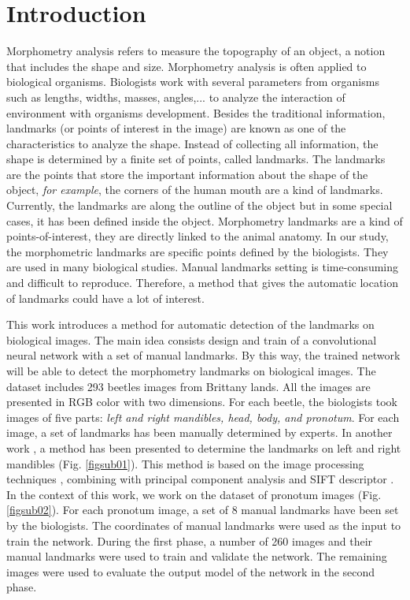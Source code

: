 \documentclass[conference]{IEEEtran}
\begin{document}
\section{Introduction}
Morphometry analysis refers to measure the topography of an object, a notion that includes the shape and size. Morphometry analysis is often applied to biological organisms. Biologists work with several parameters from organisms such as lengths, widths, masses, angles,... to analyze the interaction of environment with organisms development. Besides the traditional information, landmarks (or points of interest in the image) are known as one of the characteristics to analyze the shape. Instead of collecting all information, the shape is determined by a finite set of points, called landmarks. The landmarks are the points that store the important information about the shape of the object, \textit{for example}, the corners of the human mouth are a kind of landmarks. Currently, the landmarks are along the outline of the object but in some special cases, it has been defined inside the object. Morphometry landmarks are a kind of points-of-interest, they are directly linked to the animal anatomy. In our study, the morphometric landmarks are specific points defined by the biologists. They are used in many biological studies. Manual landmarks setting is time-consuming and difficult to reproduce. Therefore, a method that gives the automatic location of landmarks could have a lot of interest.

This work introduces a method for automatic detection of the landmarks on biological images. The main idea consists design and train of  a convolutional neural network \cite{lecun2010convolutional} with a set of manual landmarks. By this way, the trained network will be able to detect the morphometry landmarks on biological images. The dataset includes 293 beetles images from Brittany lands. All the images are presented in RGB color with two dimensions. For each beetle, the biologists took images of five parts: \textit{left and right mandibles, head, body, and pronotum}. For each image, a set of landmarks has been manually determined by experts. In another work \cite{le2017maelab}, a method has been presented to determine the landmarks on left and right mandibles (Fig. \ref{figsub01}). This method is based on the image processing techniques \cite{canny1986computational}, combining with principal component analysis \cite{shlens2014tutorial} and SIFT descriptor \cite{lowe2004distinctive}. In the context of this work, we work on the dataset of pronotum images (Fig. \ref{figsub02}). For each pronotum image, a set of 8 manual landmarks have been set by the biologists. The coordinates of manual landmarks were used as the input to train the network. During the first phase, a number of 260 images and their manual landmarks were used to train and validate the network. The remaining images were used to evaluate the output model of the network in the second phase.
\end{document}
